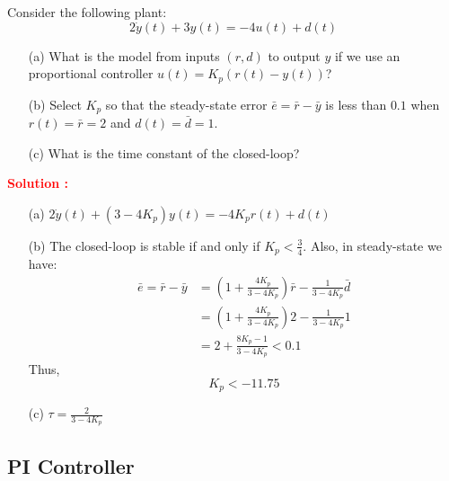 \documentclass[12pt]{article}
\begin{document}
Consider the following plant:
\begin{equation}
    2\dot{y}(t) + 3 y(t) = -4 u(t) + d(t)
\end{equation}
\begin{itemize}
    \item[(a)] What is the model from inputs \((r,d)\) to output \(y\) if we use an proportional controller \(u(t) = K_p (r(t)-y(t))\)?
    \item[(b)] Select \(K_p\) so that the steady-state error \(\bar{e} = \bar{r} - \bar{y}\) is less than \(0.1\) when \(r(t) = \bar{r} = 2\) and \(d(t) = \bar{d} = 1\).
    \item[(c)] What is the time constant of the closed-loop?
\end{itemize}
\textbf{\textcolor{red}{Solution :}} 
\begin{itemize}
    \item[(a)] $ 2 \dot{y}(t) + (3-4 K_p) y(t) = -4 K_p r(t) + d(t)$
    \item[(b)] The closed-loop is stable if and only if \(K_p < \frac{3}{4}\). Also, in steady-state we have:
    \begin{align}
        \bar{e} = \bar{r} - \bar{y} &= \left(1+\frac{4 K_p}{3-4K_p} \right)\bar{r} - \frac{1}{3-4K_p} \bar{d} \\ &= \left(1+\frac{4 K_p}{3-4K_p} \right)2 - \frac{1}{3-4K_p} 1 \\
        & = 2 + \frac{8K_p-1}{3-4K_p} < 0.1
    \end{align}
    Thus,
    \begin{equation}
        K_p < -11.75
    \end{equation}
    \item[(c)] \(\tau = \frac{2}{3-4K_p}\)
\end{itemize}

\clearpage
\subsection{PI Controller}
\end{document}
